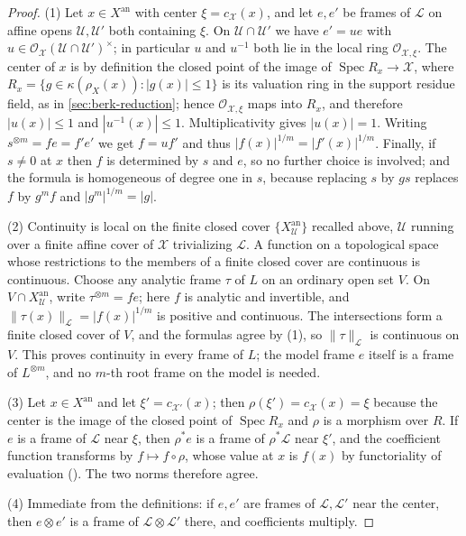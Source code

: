 \begin{proof}
(1) Let $x\in X^{\mathrm{an}}$ with center $\xi=c_{\mathcal X}(x)$, and
let $e,e'$ be frames of $\mathcal L$ on affine opens
$\mathcal U,\mathcal U'$ both containing $\xi$. On
$\mathcal U\cap\mathcal U'$ we have $e'=ue$ with
$u\in\mathcal O_{\mathcal X}(\mathcal U\cap\mathcal U')^\times$; in
particular $u$ and $u^{-1}$ both lie in the local ring
$\mathcal O_{\mathcal X,\xi}$. The center of $x$ is by definition the
closed point of the image of $\operatorname{Spec}R_x\to\mathcal X$, where
$R_x=\{g\in\kappa(\rho_X(x)):|g(x)|\le1\}$ is its valuation ring in
the support residue field, as in \cref{sec:berk-reduction};
hence $\mathcal O_{\mathcal X,\xi}$ maps into $R_x$, and therefore
$|u(x)|\le1$ and $|u^{-1}(x)|\le1$. Multiplicativity gives
$|u(x)|=1$. Writing $s^{\otimes m}=fe=f'e'$ we get $f=uf'$ and thus
$|f(x)|^{1/m}=|f'(x)|^{1/m}$. Finally, if $s\ne0$ at $x$ then $f$ is
determined by $s$ and $e$, so no further choice is involved; and the
formula is homogeneous of degree one in $s$, because replacing $s$ by
$gs$ replaces $f$ by $g^mf$ and $|g^m|^{1/m}=|g|$.

(2) Continuity is local on the finite closed cover
$\{X^{\mathrm{an}}_{\mathcal U}\}$ recalled above, $\mathcal U$ running
over a finite affine cover of $\mathcal X$ trivializing $\mathcal L$. A
function on a topological space whose restrictions to the members of a
finite closed cover are continuous is continuous. Choose any analytic frame
$\tau$ of $L$ on an ordinary open set $V$. On
$V\cap X^{\mathrm{an}}_{\mathcal U}$, write
$\tau^{\otimes m}=fe$; here $f$ is analytic and invertible, and
$\|\tau(x)\|_{\mathcal L}=|f(x)|^{1/m}$ is positive and continuous.
The intersections form a finite closed cover of $V$, and the formulas
agree by (1), so $\|\tau\|_{\mathcal L}$ is continuous on $V$.
This proves continuity in every frame of $L$; the model frame $e$ itself
is a frame of $L^{\otimes m}$, and no $m$-th root frame on the model is
needed.

(3) Let $x\in X^{\mathrm{an}}$ and let $\xi'=c_{\mathcal X'}(x)$; then
$\rho(\xi')=c_{\mathcal X}(x)=\xi$ because the center is the image of the
closed point of $\operatorname{Spec}R_x$ and $\rho$ is a morphism over
$R$. If $e$ is a frame of $\mathcal L$ near $\xi$, then
$\rho^*e$ is a frame of $\rho^*\mathcal L$ near $\xi'$, and the
coefficient function transforms by $f\mapsto f\circ\rho$, whose value at
$x$ is $f(x)$ by functoriality of evaluation
(). The two norms therefore agree.

(4) Immediate from the definitions: if $e,e'$ are frames of
$\mathcal L,\mathcal L'$ near the center, then $e\otimes e'$ is a frame
of $\mathcal L\otimes\mathcal L'$ there, and coefficients multiply.
\end{proof}

